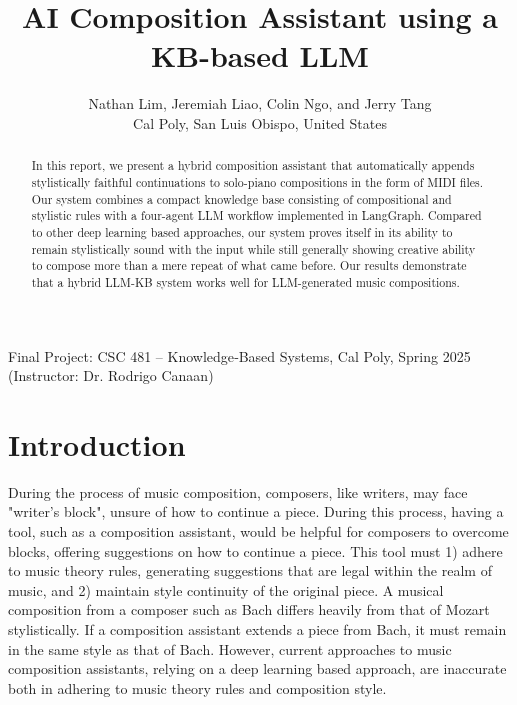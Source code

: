 \documentclass[conference]{IEEEtran}
\title{{\LARGE \bf AI Composition Assistant using a KB-based LLM}}
\author{Nathan Lim, Jeremiah Liao, Colin Ngo, and Jerry Tang\\
Cal Poly, San Luis Obispo, United States}
\begin{document}
\maketitle
\thispagestyle{empty}
\pagestyle{empty}

\noindent Final Project: CSC 481 – Knowledge‑Based Systems, Cal Poly, Spring 2025 (Instructor: Dr. Rodrigo Canaan)\\

\begin{abstract}
In this report, we present a hybrid composition assistant that automatically appends stylistically faithful continuations to solo-piano compositions in the form of MIDI files. Our system combines a compact knowledge base consisting of compositional and stylistic rules with a four-agent LLM workflow implemented in LangGraph. Compared to other deep learning based approaches, our system proves itself in its ability to remain stylistically sound with the input while still generally showing creative ability to compose more than a mere repeat of what came before. Our results demonstrate that a hybrid LLM-KB system works well for LLM-generated music compositions.
\end{abstract}

\section{Introduction}

During the process of music composition, composers, like writers, may face "writer's block", unsure of how to continue a piece. During this process, having a tool, such as a composition assistant, would be helpful for composers to overcome blocks, offering suggestions on how to continue a piece. This tool must 1) adhere to music theory rules, generating suggestions that are legal within the realm of music, and 2) maintain style continuity of the original piece. A musical composition from a composer such as Bach differs heavily from that of Mozart stylistically. If a composition assistant extends a piece from Bach, it must remain in the same style as that of Bach. However, current approaches to music composition assistants, relying on a deep learning based approach, are inaccurate both in adhering to music theory rules and composition style. 
\end{document}
